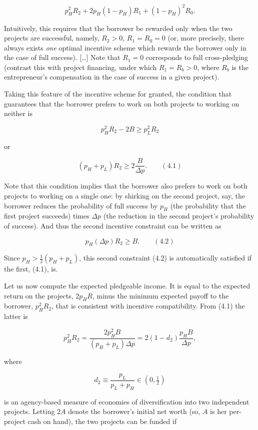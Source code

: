 \documentclass[11pt,a4paper]{article}
\begin{document}
\[p_H^2 R_2 + 2 p_H (1 - p_H) R_1 + (1 - p_H)^2 R_0.\]

Intuitively, this requires that the borrower be rewarded only when the two projects are successful,
namely, \(R_2 > 0\), \(R_1 = R_0 = 0\) (or, more precisely, there always exists \emph{one} optimal
incentive scheme which rewards the borrower only in the case of full success). {[}\ldots{]} Note
that \(R_1 = 0\) corresponds to full cross-pledging (contrast this with project financing, under
which \(R_1 = R_b > 0\), where \(R_b\) is the entrepreneur's compensation in the case of success in
a given project).

Taking this feature of the incentive scheme for granted, the condition that guarantees that the
borrower prefers to work on both projects to working on neither is

\[p_H^2 R_2 - 2B \geqslant p_L^2 R_2\]

or

\[(p_H + p_L) R_2 \geqslant 2 \frac{B}{\Delta p}. \qquad (4.1)\]

Note that this condition implies that the borrower also prefers to work on both projects to working
on a single one: by shirking on the second project, say, the borrower reduces the probability of
full success by \(p_H\) (the probability that the first project succeeds) times \(\Delta p\) (the
reduction in the second project's probability of success). And thus the second incentive constraint
can be written as

\[p_H (\Delta p) R_2 \geqslant B. \qquad (4.2)\]

Since \(p_H > \frac{1}{2}(p_H + p_L)\), this second constraint (4.2) is automatically satisfied if
the first, (4.1), is.

Let us now compute the expected pledgeable income. It is equal to the expected return on the
projects, \(2 p_H R\), minus the minimum expected payoff to the borrower, \(p_H^2 R_2\), that is
consistent with incentive compatibility. From (4.1) the latter is

\[p_H^2 R_2 = \frac{2 p_H^2 B}{(p_H + p_L) \Delta p} = 2(1 - d_2) \frac{p_H B}{\Delta p},\]

where

\[d_2 \equiv \frac{p_L}{p_L + p_H} \in \left(0, \tfrac{1}{2}\right)\]

is an agency-based measure of economies of diversification into two independent projects. Letting
\(2A\) denote the borrower's initial net worth (so, \(A\) is her per-project cash on hand), the two
projects can be funded if
\end{document}

